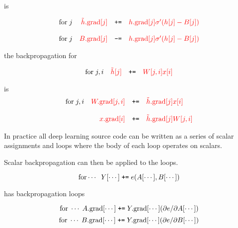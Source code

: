 {\vfill
is

\vfill
$$\begin{array}{lrcl}
\mathrm{for}\;j & {\color{red} \tilde{h}.\mathrm{grad}[j]} & \mbox{\tt +=} & {\color{red} h.\mathrm{grad}[j]\sigma'(h[j] - B[j])} \\
\\
\mathrm{for}\;j & {\color{red} B.\mathrm{grad}[j]} & \mbox{\tt -=} & {\color{red} h.\mathrm{grad}[j]\sigma'(h[j] - B[j])}
\end{array}$$

the backpropagation for

$$\begin{array}{lrcl}
\mathrm{for}\;j,i & {\color{red} \tilde{h}[j]} & \mbox{\tt +=} & {\color{red} W[j,i]x[i]}
\end{array}$$

\vfill
is
$$\begin{array}{lrcl}
\mathrm{for}\;j,i & {\color{red} W.\mathrm{grad}[j,i]} & \mbox{\tt +=} & {\color{red} \tilde{h}.\mathrm{grad}[j] x[i]} \\
\\
& {\color{red} x.\mathrm{grad}[i]} & \mbox{\tt +=} & {\color{red} \tilde{h}.\mathrm{grad}[j] W[j,i]} \\
\end{array}$$


In practice all deep learning source code can be written as a series of scalar assignments and loops where the body of each loop operates on scalars.

\vfill
Scalar backpropagation can then be applied to the loops.

\vfill
$$\mathrm{for} \cdots \;\;Y[\cdots] \;\mbox{\tt +=}\; e(A[\cdots],B[\cdots])$$

\vfill
has backpropagation loops

\vfill
$$\mathrm{for}\;\cdots \;A.\mathrm{grad}[\cdots] \;\mbox{\tt +=}\; Y.\mathrm{grad}[\cdots](\partial e/\partial A[\cdots])$$
$$\mathrm{for}\;\cdots \;B.\mathrm{grad}[\cdots] \;\mbox{\tt +=}\; Y.\mathrm{grad}[\cdots](\partial e/\partial B[\cdots])$$

}


